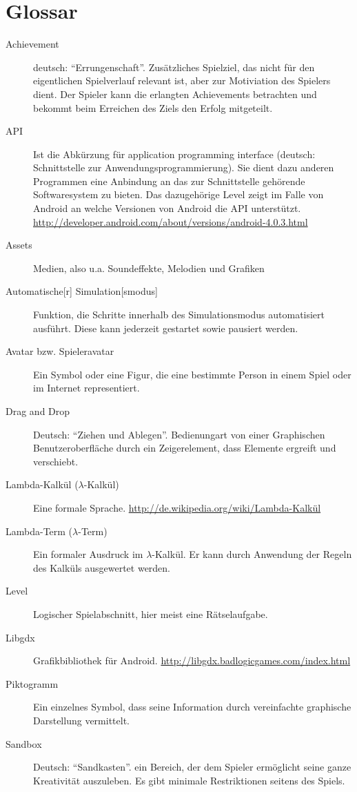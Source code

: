 \section{Glossar}
\begin{description}
	\item[Achievement] deutsch: ``Errungenschaft''. Zusätzliches Spielziel, das nicht für den eigentlichen Spielverlauf relevant ist, aber zur Motiviation des Spielers dient.
		Der Spieler kann die erlangten Achievements betrachten und bekommt beim Erreichen des Ziels den Erfolg mitgeteilt.
	\item[API] Ist die Abkürzung für application programming interface (deutsch: Schnittstelle zur Anwendungsprogrammierung). Sie dient dazu anderen Programmen eine Anbindung an das zur Schnittstelle gehörende Softwaresystem zu bieten. Das dazugehörige Level zeigt im Falle von Android an welche Versionen von Android die API unterstützt. \url{http://developer.android.com/about/versions/android-4.0.3.html}
	\item[Assets] Medien, also u.a. Soundeffekte, Melodien und Grafiken
	\item[Automatische{[}r{]} Simulation{[}smodus{]}] Funktion, die Schritte innerhalb des Simulationsmodus automatisiert ausführt. Diese kann jederzeit gestartet sowie pausiert werden.
	\item [Avatar bzw. Spieleravatar] Ein Symbol oder eine Figur, die eine bestimmte Person in einem Spiel oder im Internet representiert.
	\item [Drag and Drop] Deutsch: ``Ziehen und Ablegen''. Bedienungart von  einer Graphischen Benutzeroberfläche durch ein Zeigerelement, dass Elemente ergreift und verschiebt.
	\item[Lambda-Kalkül (\(\lambda\)-Kalkül)] Eine formale Sprache. \url{http://de.wikipedia.org/wiki/Lambda-Kalkül}
	\item[Lambda-Term (\(\lambda\)-Term)] Ein formaler Ausdruck im \(\lambda\)-Kalkül.
		Er kann durch Anwendung der Regeln des Kalküls ausgewertet werden.
	\item[Level] Logischer Spielabschnitt, hier meist eine Rätselaufgabe.
	\item[Libgdx] Grafikbibliothek für Android. \url{http://libgdx.badlogicgames.com/index.html}
	\item [Piktogramm] Ein einzelnes Symbol, dass seine Information durch vereinfachte graphische Darstellung vermittelt.
	\item [Sandbox] Deutsch: ``Sandkasten''. ein Bereich, der dem Spieler ermöglicht seine ganze Kreativität auszuleben. Es gibt minimale Restriktionen seitens des Spiels.

\end{description}

